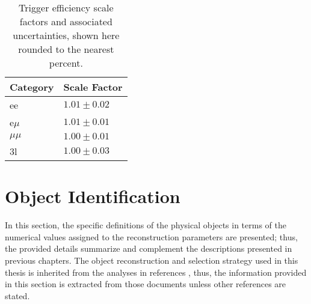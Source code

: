 \begin{table}
\centering
\begin{tabular}{ll}
Category & Scale Factor \\\hline
    ee   & $1.01 \pm 0.02$ \\
e$\mu$   & $1.01 \pm 0.01$ \\
$\mu\mu$ & $1.00 \pm 0.01$ \\
3l       & $1.00 \pm 0.03$ \\\hline
\end{tabular}
\caption[Trigger efficiency scale factors and associated uncertainties.]{Trigger efficiency scale factors and associated uncertainties, shown here rounded to the nearest percent.}
\label{tab:trigSFs}
\end{table}


















































\section{Object Identification}\label{sec:ob_id}


In this section, the specific definitions of the physical objects in terms of the numerical values assigned to the reconstruction parameters are presented; thus, the provided details summarize and complement the descriptions presented in previous chapters. The object reconstruction and selection strategy used in this thesis is inherited from the analyses in references \cite{CMS_AN_2016-211,CMS_AN_2017-029}, thus, the information provided in this section is extracted from those documents unless other references are stated.

